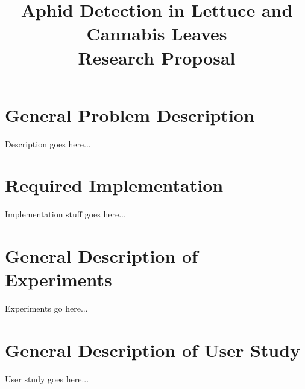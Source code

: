 \documentclass{article}
\title{Aphid Detection in Lettuce and Cannabis Leaves \\ Research Proposal}
\begin{document}
\maketitle

\section*{General Problem Description}
Description goes here...

\section*{Required Implementation}
Implementation stuff goes here...

\section*{General Description of Experiments}
Experiments go here...

\section*{General Description of User Study}
User study goes here...
\end{document}
